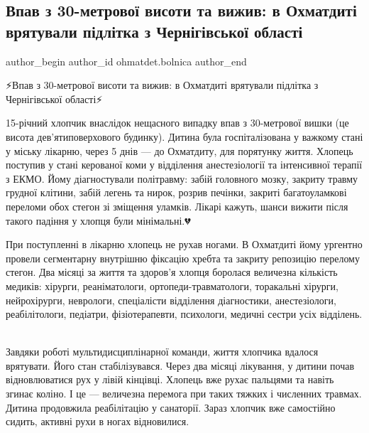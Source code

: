  
 
 
 
 

\subsection{Впав з 30-метрової висоти та вижив: в Охматдиті врятували підлітка з Чернігівської області}
\label{sec:17_01_2023.fb.ohmatdet.bolnica.1.vpav_z_30_metrovo__v}

\ifcmt
 author_begin
   author_id ohmatdet.bolnica
 author_end
\fi

⚡️Впав з 30-метрової висоти та вижив: в Охматдиті врятували підлітка з
Чернігівської області⚡️

15-річний хлопчик внаслідок нещасного випадку впав з 30-метрової вишки (це
висота дев'ятиповерхового будинку). Дитина була госпіталізована у важкому стані
у міську лікарню, через 5 днів — до Охматдиту, для порятунку життя. Хлопець
поступив у стані керованої коми у відділення анестезіології та інтенсивної
терапії з ЕКМО. Йому діагностували політравму: забій головного мозку, закриту
травму грудної клітини, забій легень та нирок, розрив печінки, закриті
багатоуламкові переломи обох стегон зі зміщення уламків. Лікарі кажуть, шанси
вижити після такого падіння у хлопця були мінімальні.💔

При поступленні в лікарню хлопець не рухав ногами. В Охматдиті йому ургентно
провели сегментарну внутрішню фіксацію хребта та закриту репозицію перелому
стегон. Два місяці за життя та здоров'я хлопця боролася величезна кількість
медиків: хірурги, реаніматологи, ортопеди-травматологи, торакальні хірурги,
нейрохірурги, неврологи, спеціалісти відділення діагностики, анестезіологи,
реабілітологи, педіатри, фізіотерапевти, психологи, медичні сестри усіх
відділень.🙏🏻

Завдяки роботі мультидисциплінарної команди, життя хлопчика вдалося врятувати.
Його стан стабілізувався. Через два місяці лікування, у дитини почав
відновлюватися рух у лівій кінцівці. Хлопець вже рухає пальцями та навіть
згинає коліно. І це — величезна перемога при таких тяжких і численних травмах.
Дитина продовжила реабілітацію у санаторії. Зараз хлопчик вже самостійно
сидить, активні рухи в ногах відновилися.🙌🏻

